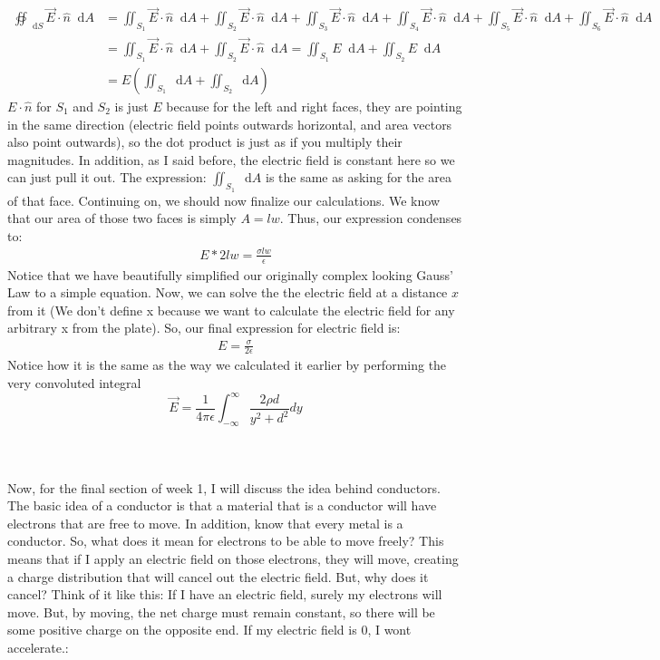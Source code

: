 \documentclass{article}
\newcommand*\dif{\mathop{}\!\mathrm{d}}
\begin{document}
\begin{align*}
	\oiint_{\dif S} \vec{E} \cdot \hat{n} \dif A &= \iint_{S_1} \vec{E} \cdot \hat{n} \dif A + \iint_{S_2} \vec{E} \cdot \hat{n} \dif A + \iint_{S_3} \vec{E} \cdot \hat{n} \dif A + \iint_{S_4} \vec{E} \cdot \hat{n} \dif A + \iint_{S_5} \vec{E} \cdot \hat{n} \dif A + \iint_{S_6} \vec{E} \cdot \hat{n} \dif A \\
	&= \iint_{S_1} \vec{E} \cdot \hat{n} \dif A + \iint_{S_2} \vec{E} \cdot \hat{n} \dif A = \iint_{S_1} E \dif A + \iint_{S_2} E \dif A\\
	&= E(\iint_{S_1} \dif A + \iint_{S_2} \dif A)
\end{align*}
$E\cdot \hat{n}$ for $S_1$ and $S_2$ is just $E$ because for the left and right faces, they are pointing in the same direction (electric field points outwards horizontal, and area vectors also point outwards), so the dot product is just as if you multiply their magnitudes. In addition, as I said before, the electric field is constant here so we can just pull it out. The expression: $\iint_{S_1} \dif A$ is the same as asking for the area of that face. Continuing on, we should now finalize our calculations.
We know that our area of those two faces is simply $A = lw$. Thus, our expression condenses to:
\begin{align*}
	E*2lw = \frac{\sigma lw}{\epsilon}
\end{align*}
Notice that we have beautifully simplified our originally complex looking Gauss' Law to a simple equation. Now, we can solve the the electric field at a distance $x$ from it (We don't define x because we want to calculate the electric field for any arbitrary x from the plate). So, our final expression for electric field is:
\begin{align*}
	E =  \frac{\sigma}{2\epsilon}
\end{align*}
Notice how it is the same as the way we calculated it earlier by performing the very convoluted integral $$\vec{E} = \frac{1}{4\pi\epsilon}\int_{-\infty}^{\infty} \frac{2\rho d}{y^2 + d^2} dy$$
\\
\\
\\
Now, for the final section of week 1, I will discuss the idea behind conductors. The basic idea of a conductor is that a material that is a conductor will have electrons that are free to move. In addition, know that every metal is a conductor. So, what does it mean for electrons to be able to move freely? This means that if I apply an electric field on those electrons, they will move, creating a charge distribution that will cancel out the electric field. But, why does it cancel? Think of it like this: If I have an electric field, surely my electrons will move. But, by moving, the net charge must remain constant, so there will be some positive charge on the opposite end. If my electric field is 0, I wont accelerate.:
\end{document}
